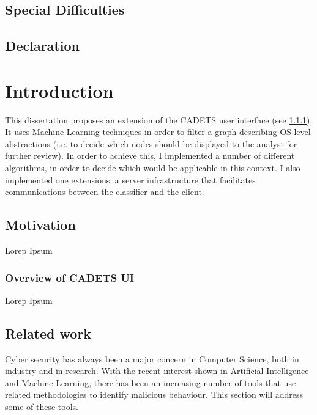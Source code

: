 \documentclass[12pt,a4paper,twoside,openright]{report}
\begin{document}
\section*{Special Difficulties}

\newpage

\section*{Declaration}


\tableofcontents


\listoffigures


\listoftables


\chapter{Introduction}

This dissertation proposes an extension of the CADETS user interface (see \ref{1.1.1}). It uses Machine Learning techniques in order to filter a graph describing OS-level abstractions (i.e. to decide which nodes should be displayed to the analyst for further review). In order to achieve this, I implemented a number of different algorithms, in order to decide which would be applicable in this context. I also implemented one extensions: a server infrastructure that facilitates communications between the classifier and the client.

\section{Motivation}  \label{1.1}
Lorep Ipsum
\subsection{Overview of CADETS UI}\label{1.1.1}
Lorep Ipsum
\section{Related work}
Cyber security has always been a major concern in Computer Science, both in industry and in research. With the recent interest shown in Artificial Intelligence and Machine Learning, there has been an increasing number of tools that use related methodologies to identify malicious behaviour. This section will address some of these tools. 
\end{document}

